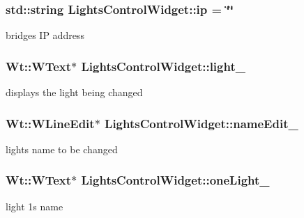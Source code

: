 \subsubsection[{\texorpdfstring{ip}{ip}}]{\setlength{\rightskip}{0pt plus 5cm}std\+::string Lights\+Control\+Widget\+::ip = \char`\"{}\char`\"{}\hspace{0.3cm}{\ttfamily [private]}}\hypertarget{classLightsControlWidget_aa2855e24d3d1afbcf6fcd2992abc47af}{}\label{classLightsControlWidget_aa2855e24d3d1afbcf6fcd2992abc47af}
bridge\textquotesingle{}s IP address 
\subsubsection[{\texorpdfstring{light\+\_\+}{light_}}]{\setlength{\rightskip}{0pt plus 5cm}Wt\+::\+W\+Text$\ast$ Lights\+Control\+Widget\+::light\+\_\+\hspace{0.3cm}{\ttfamily [private]}}\hypertarget{classLightsControlWidget_a071eae068aef8f47a36e728ae3ad6378}{}\label{classLightsControlWidget_a071eae068aef8f47a36e728ae3ad6378}
displays the light being changed 
\subsubsection[{\texorpdfstring{name\+Edit\+\_\+}{nameEdit_}}]{\setlength{\rightskip}{0pt plus 5cm}Wt\+::\+W\+Line\+Edit$\ast$ Lights\+Control\+Widget\+::name\+Edit\+\_\+\hspace{0.3cm}{\ttfamily [private]}}\hypertarget{classLightsControlWidget_aff7b495c562df75a6006ad6bef43f96f}{}\label{classLightsControlWidget_aff7b495c562df75a6006ad6bef43f96f}
light\textquotesingle{}s name to be changed 
\subsubsection[{\texorpdfstring{one\+Light\+\_\+}{oneLight_}}]{\setlength{\rightskip}{0pt plus 5cm}Wt\+::\+W\+Text$\ast$ Lights\+Control\+Widget\+::one\+Light\+\_\+\hspace{0.3cm}{\ttfamily [private]}}\hypertarget{classLightsControlWidget_a5d33dac9a47a7862e6cc060e1e0fb335}{}\label{classLightsControlWidget_a5d33dac9a47a7862e6cc060e1e0fb335}
light 1\textquotesingle{}s name 
